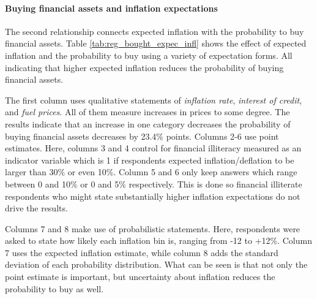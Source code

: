 \documentclass[ProjectABM]{subfiles}
\begin{document}



\paragraph{Buying financial assets and inflation expectations}
The second relationship connects expected inflation with the probability to buy financial assets. %
Table \ref{tab:reg_bought_expec_infl} shows the effect of expected inflation and the probability to buy using a variety of expectation forms. All indicating that higher expected inflation reduces the probability of buying financial assets.

The first column uses qualitative statements of \textit{inflation rate}, \textit{interest of credit}, and \textit{fuel prices}. All of them measure increases in prices to some degree. The results indicate that an increase in one category decreases the probability of buying financial assets decreases by 23.4\% points. Columns 2-6 use point estimates. Here, columns 3 and 4 control for financial illiteracy measured as an indicator variable which is 1 if respondents expected inflation/deflation to be larger than 30\% or even 10\%. Column 5 and 6 only keep answers which range between 0 and 10\% or 0 and 5\% respectively. This is done so financial illiterate respondents who might state substantially higher inflation expectations do not drive the results.

Columns 7 and 8 make use of probabilistic statements. Here, respondents were asked to state how likely each inflation bin is, ranging from -12 to +12\%. Column 7 uses the expected inflation estimate, while column 8 adds the standard deviation of each probability distribution. What can be seen is that not only the point estimate is important, but uncertainty about inflation reduces the probability to buy as well.
\end{document}
